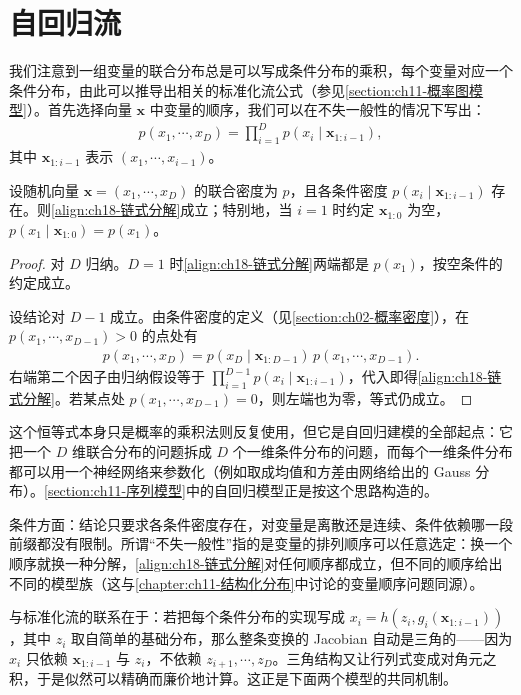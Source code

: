 \documentclass[../../main.tex]{subfiles}
\begin{document}
\section{自回归流}\label{section:ch18-自回归流}

我们注意到一组变量的联合分布总是可以写成条件分布的乘积，每个变量对应一个条件分布，由此可以推导出相关的标准化流公式（参见\cref{section:ch11-概率图模型}）。首先选择向量 $\bm{x}$ 中变量的顺序，我们可以在不失一般性的情况下写出：
\begin{align}
  p(x_1,\cdots,x_D)=\prod_{i=1}^{D}p(x_i\mid\bm{x}_{1:i-1}),\label{align:ch18-链式分解}
\end{align}
其中 $\bm{x}_{1:i-1}$ 表示 $(x_1,\cdots,x_{i-1})$。

\begin{proposition}[条件分布的链式分解]\label{proposition:ch18-链式分解}
设随机向量 $\bm{x}=(x_1,\cdots,x_D)$ 的联合密度为 $p$，且各条件密度 $p(x_i\mid\bm{x}_{1:i-1})$ 存在。则\eqref{align:ch18-链式分解}成立；特别地，当 $i=1$ 时约定 $\bm{x}_{1:0}$ 为空，$p(x_1\mid\bm{x}_{1:0})=p(x_1)$。
\end{proposition}

\begin{proof}
对 $D$ 归纳。$D=1$ 时\eqref{align:ch18-链式分解}两端都是 $p(x_1)$，按空条件的约定成立。

设结论对 $D-1$ 成立。由条件密度的定义（见\cref{section:ch02-概率密度}），在 $p(x_1,\cdots,x_{D-1})>0$ 的点处有
\begin{align*}
  p(x_1,\cdots,x_D)=p(x_D\mid\bm{x}_{1:D-1})\,p(x_1,\cdots,x_{D-1}).
\end{align*}
右端第二个因子由归纳假设等于 $\prod_{i=1}^{D-1}p(x_i\mid\bm{x}_{1:i-1})$，代入即得\eqref{align:ch18-链式分解}。若某点处 $p(x_1,\cdots,x_{D-1})=0$，则左端也为零，等式仍成立。
\end{proof}

\begin{remark}
这个恒等式本身只是概率的乘积法则反复使用，但它是自回归建模的全部起点：它把一个 $D$ 维联合分布的问题拆成 $D$ 个一维条件分布的问题，而每个一维条件分布都可以用一个神经网络来参数化（例如取成均值和方差由网络给出的 Gauss 分布）。\cref{section:ch11-序列模型}中的自回归模型正是按这个思路构造的。

条件方面：结论只要求各条件密度存在，对变量是离散还是连续、条件依赖哪一段前缀都没有限制。所谓“不失一般性”指的是变量的排列顺序可以任意选定：换一个顺序就换一种分解，\eqref{align:ch18-链式分解}对任何顺序都成立，但不同的顺序给出不同的模型族（这与\cref{chapter:ch11-结构化分布}中讨论的变量顺序问题同源）。

与标准化流的联系在于：若把每个条件分布的实现写成 $x_i=h(z_i,g_i(\bm{x}_{1:i-1}))$，其中 $z_i$ 取自简单的基础分布，那么整条变换的 Jacobian 自动是三角的——因为 $x_i$ 只依赖 $\bm{x}_{1:i-1}$ 与 $z_i$，不依赖 $z_{i+1},\cdots,z_D$。三角结构又让行列式变成对角元之积，于是似然可以精确而廉价地计算。这正是下面两个模型的共同机制。
\end{remark}
\end{document}
